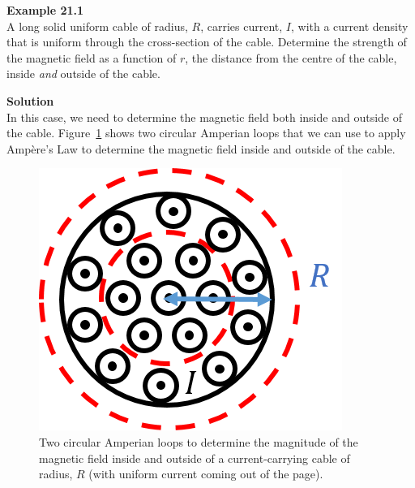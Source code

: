 \begin{framed}
\textbf{Example 21.1}\\
A long solid uniform cable of radius, $R$, carries current, $I$, with a current density that is uniform through the cross-section of the cable. Determine the strength of the magnetic field as a function of $r$, the distance from the centre of the cable, inside \textit{and} outside of the cable.

\begin{framed}
\textbf{Solution}\\
In this case, we need to determine the magnetic field both inside and outside of the cable. Figure~\ref{fig:magneticsource:amperecable} shows two circular Amperian loops that we can use to apply Ampère's Law to determine the magnetic field inside and outside of the cable.

\begin{figure}[!htbp]
\centering
\includegraphics[width=0.4\linewidth]{files/amperecable-c842bce99807fda38aa74536705a03e7.png}
\caption[]{Two circular Amperian loops to determine the magnitude of the magnetic field inside and outside of a current-carrying cable of radius, $R$ (with uniform current coming out of the page).}
\label{fig:magneticsource:amperecable}
\end{figure}


\end{framed}
\end{framed}
